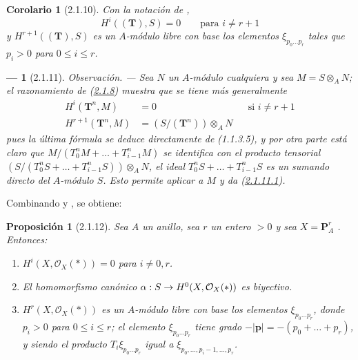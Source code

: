 \documentclass[10pt,oneside,openany]{book}
\theoremstyle{egaenv}\newtheorem*{env}{---}
\theoremstyle{egastatement}
\newtheorem*{proposition}{Proposición}
\newtheorem*{corollary}{Corolario}
\theoremstyle{egadescription}
\newcommand{\oldpage}[2][]{\marginnote{\normalfont\scriptsize\textbf{#1}\,|\,#2}\ignorespaces}
\renewcommand{\leq}{\leqslant}
\renewcommand{\to}{\mathchoice{\longrightarrow}{\rightarrow}{\rightarrow}{\rightarrow}}
\begin{document}
\begin{corollary}[2.1.10]
\label{III.2.1.10}
\label{III.2.1.10-fr}
Con la notación de ,
\begin{equation}
\label{III.2.1.10.1-fr}
\tag{2.1.10.1}
H^i((\mathbf T),S)=0\qquad\text{para }i\neq r+1
\end{equation}
y $H^{r+1}((\mathbf T),S)$ es un $A$-módulo libre con base los elementos $\xi_{p_0\ldots p_r}$ tales que $p_i>0$ para $0\leq i\leq r$.
\end{corollary}

\begin{env}[2.1.11]
\label{III.2.1.11}
\label{III.2.1.11-fr}
\emph{Observación.} ---
Sea $N$ un $A$-módulo cualquiera y sea $M=S\otimes_A N$; el razonamiento de
(\hyperref[III.2.1.8-fr]{2.1.8}) muestra que se tiene más generalmente
\begin{align}
\label{III.2.1.11.1-fr}
\tag{2.1.11.1}
H^i(\mathbf T^n,M)&=0 &&\text{si }i\neq r+1\\
\label{III.2.1.11.2-fr}
\tag{2.1.11.2}
H^{r+1}(\mathbf T^n,M)&=(S/(\mathbf T^n))\otimes_A N
\end{align}
pues la última fórmula se deduce directamente de (1.1.3.5), y por otra
parte está claro que
$M/(T_0^nM+\ldots+T_{i-1}^nM)$
se identifica con el producto tensorial
$(S/(T_0^nS+\ldots+T_{i-1}^nS))\otimes_A N$,
el ideal $T_0^nS+\ldots+T_{i-1}^nS$ es un sumando directo del $A$-módulo $S$.
Esto permite aplicar  a $M$ y da (\hyperref[III.2.1.11.1]{2.1.11.1}).
\end{env}

Combinando  y , se obtiene:

\begin{proposition}[2.1.12]
\label{III.2.1.12}
\label{III.2.1.12-fr}
Sea $A$ un anillo, sea $r$ un entero $>0$ y sea $X=\mathbf P_A^r$ .
Entonces:
\begin{enumerate}
  \item[{\rm(i)}] $H^i(X,\mathcal O_X(*))=0$ para $i\neq0,r$.
  \item[{\rm(ii)}] El homomorfismo canónico $\alpha:S\to H^0(X,\mathcal O_X(*))$  es biyectivo.
\oldpage[III]{99}
  \item[{\rm(iii)}] $H^r(X,\mathcal O_X(*))$ es un $A$-módulo libre con base los elementos $\xi_{p_0\ldots p_r}$, donde $p_i>0$ para $0\leq i\leq r$; el elemento $\xi_{p_0\ldots p_r}$ tiene grado $-|\mathbf p|=-(p_0+\ldots+p_r)$, y siendo el producto
$T_i\xi_{p_0\ldots p_r}$ igual a
$\xi_{p_0,\ldots,p_i-1,\ldots,p_r}$.
\end{enumerate}
\end{proposition}
\end{document}
